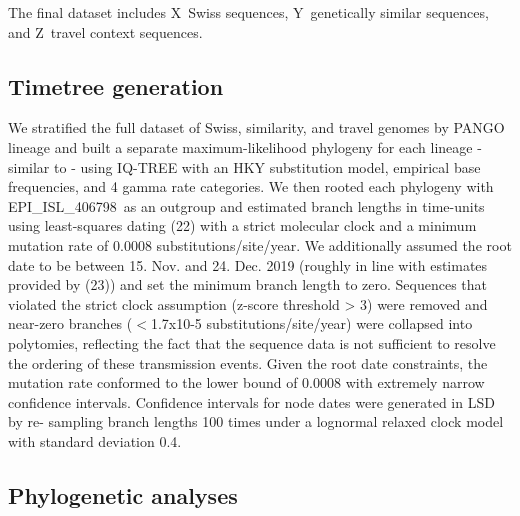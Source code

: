 \documentclass[9pt,twocolumn,twoside,lineno]{pnas-new}
\newcommand\outgroupisl{EPI\_ISL\_406798}
\newcommand\nswissseqs{X}
\newcommand\nsimseqs{Y}
\newcommand\ntravelseqs{Z}
\begin{document}

The final dataset includes \nswissseqs\ Swiss sequences, \nsimseqs\ genetically similar sequences, and \ntravelseqs\ travel context sequences.

\subsection{Timetree generation}
We stratified the full dataset of Swiss, similarity, and travel genomes by PANGO lineage and built a separate maximum-likelihood phylogeny for each lineage - similar to \cite{DuPlessis2020} - using IQ-TREE \cite{Nguyen2014} with an HKY substitution model, empirical base frequencies, and 4 gamma rate categories. We then rooted each phylogeny with \outgroupisl\ as an outgroup and estimated branch lengths in time-units using least-squares dating (22) with a strict molecular clock and a minimum mutation rate of 0.0008 substitutions/site/year. We additionally assumed the root date to be between 15. Nov. and 24. Dec. 2019 (roughly in line with estimates provided by (23)) and set the minimum branch length to zero. Sequences that violated the strict clock assumption (z-score threshold > 3) were removed and near-zero branches ($<$1.7x10-5 substitutions/site/year) were collapsed into polytomies, reflecting the fact that the sequence data is not sufficient to resolve the ordering of these transmission events. Given the root date constraints, the mutation rate conformed to the lower bound of 0.0008 with extremely narrow confidence intervals. Confidence intervals for node dates were generated in LSD by re- sampling branch lengths 100 times under a lognormal relaxed clock model with standard deviation 0.4.

\subsection{Phylogenetic analyses}
\end{document}
